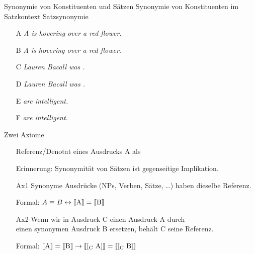 \begin{frame}
  {Synonymie von Konstituenten und Sätzen}
  Synonymie von Konstituenten im Satzkontext  Satzsynonymie\\
  \onslide<+->
  \Halbzeile
  \begin{itemize}[<+->]
    \item[A] \alert{\textit{A  is hovering over a red flower.}}
    \item[B] \alert{\textit{A  is hovering over a red flower.}}
    \item[ ] 
    \item[ ] 
      \Halbzeile
    \item[C] \alert{\textit{Lauren Bacall was .}}
    \item[D] \alert{\textit{Lauren Bacall was .}}
    \item[ ] 
      \Halbzeile
    \item[E] \alert{\textit{ are intelligent.}}
    \item[F] \alert{\textit{ are intelligent.}}
    \item[ ] 
  \end{itemize}
\end{frame}

\begin{frame}
  {Zwei Axiome}
  \onslide<+->
  \begin{itemize}[<+->]
    \item[ ] Referenz\slash Denotat eines Ausdrucks A als \alert{}\\
      \Zeile
    \item[ ] Erinnerung: Synonymität von Sätzen ist gegenseitige Implikation.
      \Zeile
    \item[Ax1] Synonyme Ausdrücke (NPs, Verben, Sätze, \ldots) haben dieselbe Referenz.
    \item[ ] Formal: \alert{$A\equiv B\leftrightarrow\llbracket\text{A}\rrbracket=\llbracket\text{B}\rrbracket$}
      \Zeile
    \item[Ax2] Wenn wir in Ausdruck C einen Ausdruck A durch\\
      einen synonymen Ausdruck B ersetzen, behält C seine Referenz.
    \item[ ] Formal: \alert{$\llbracket\text{A}\rrbracket=\llbracket\text{B}\rrbracket\rightarrow\llbracket\text{[\ensuremath{_{\text{C}}} A]}\rrbracket=\llbracket\text{[\ensuremath{_{\text{C}}} B]}\rrbracket$}
  \end{itemize}
\end{frame}

